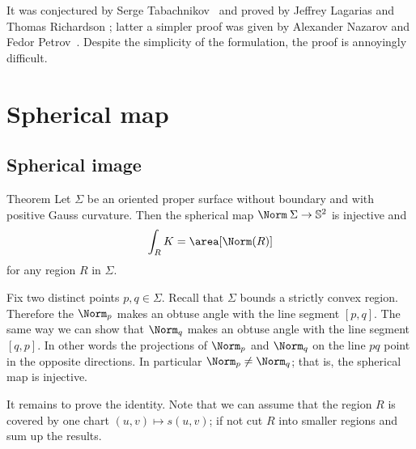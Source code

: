 It was  conjectured by Serge Tabachnikov~\cite{tabachnikov} and proved by Jeffrey Lagarias and Thomas Richardson \cite{lagarias-richardso}; latter a simpler proof was given by Alexander Nazarov and Fedor Petrov~\cite{nazarov-petrov}.
Despite the simplicity of the formulation, the proof is annoyingly difficult.




























\chapter{Spherical map}





\section*{Spherical image}


\begin{thm}{Theorem}\label{thm:spherical-image}
Let $\Sigma$ be an oriented proper surface without boundary and with positive Gauss curvature.
Then the spherical map $\Norm\:\Sigma\to\mathbb{S}^2$ is injective and
\[\int_R K=\area[\Norm(R)]\]
for any region $R$ in $\Sigma$. %
\end{thm}

Fix two distinct points $p,q\in\Sigma$.
Recall that $\Sigma$ bounds a strictly convex region.
Therefore the $\Norm_p$ makes an obtuse angle with the line segment $[p,q]$. %
The same way we can show that $\Norm_q$ makes an obtuse angle with the line segment $[q,p]$.
In other words the projections of $\Norm_p$ and $\Norm_q$ on the line $pq$ point in the opposite directions.
In particular $\Norm_p\ne \Norm_q$; that is, the spherical map is injective.

It remains to prove the identity.
Note that we can assume that the region $R$ is covered by one chart $(u,v)\mapsto s(u,v)$; if not cut $R$ into smaller regions and sum up the results.

